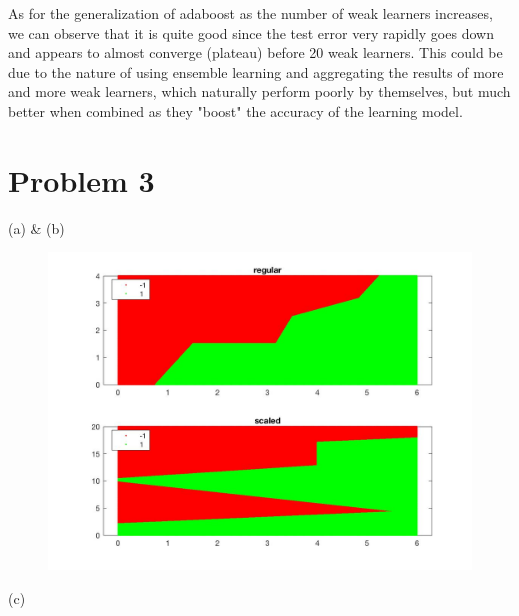 \documentclass[12pt,letterpaper]{article}
\begin{document}
\begin{description}
As for the generalization of adaboost as the number of weak learners increases, we can observe that it is quite good since the test error very rapidly goes down and appears to almost converge (plateau) before 20 weak learners. This could be due to the nature of using ensemble learning and aggregating the results of more and more weak learners, which naturally perform poorly by themselves, but much better when combined as they "boost" the accuracy of the learning model.

\end{description}

\section*{Problem 3}
\begin{description}
	\item (a) \& (b)
\begin{figure}[H]
\includegraphics[scale=0.4]{image3.jpg} 
\end{figure}
	\item (c) 

\end{description}
\end{document}
